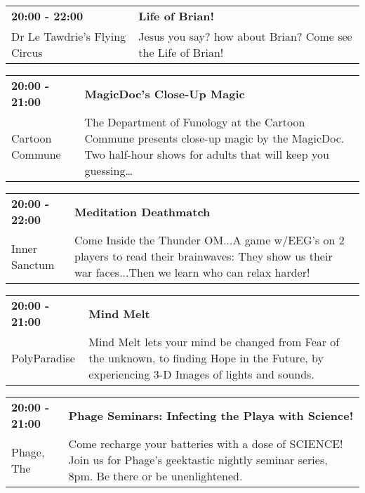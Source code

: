 \begin{tabular}{ p{1in} p{2.2in} }
    \textbf{20:00 - 22:00} & \textbf{Life of Brian!} \\
    Dr Le Tawdrie's Flying Circus \newline  & Jesus you say? how about Brian? Come see the Life of Brian! \\
    \hline 
\end{tabular}
    
\begin{tabular}{ p{1in} p{2.2in} }
    \textbf{20:00 - 21:00} & \textbf{MagicDoc's Close-Up Magic } \\
    Cartoon Commune \newline  & The Department of Funology at the Cartoon Commune presents close-up magic by the MagicDoc. Two half-hour shows for adults that will keep you guessing\ldots \\
    \hline 
\end{tabular}
    
\begin{tabular}{ p{1in} p{2.2in} }
    \textbf{20:00 - 22:00} & \textbf{Meditation Deathmatch} \\
    Inner Sanctum \newline  & Come Inside the Thunder OM...A game w/EEG's on 2 players to read their brainwaves: They show us their war faces...Then we learn who can relax harder! \\
    \hline 
\end{tabular}
    
\begin{tabular}{ p{1in} p{2.2in} }
    \textbf{20:00 - 21:00} & \textbf{Mind Melt } \\
    PolyParadise \newline  & Mind Melt lets your mind be changed from Fear of the unknown, to finding Hope in the Future, by experiencing 3-D Images of lights and sounds. \\
    \hline 
\end{tabular}
    
\begin{tabular}{ p{1in} p{2.2in} }
    \textbf{20:00 - 21:00} & \textbf{Phage Seminars: Infecting the Playa with Science!} \\
    Phage, The \newline  & Come recharge your batteries with a dose of SCIENCE! Join us for Phage's geektastic nightly seminar series, 8pm. Be there or be unenlightened. \\
    \hline 
\end{tabular}
    
